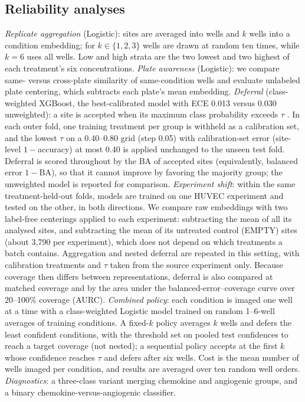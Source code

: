 \documentclass[conference]{IEEEtran}
\begin{document}
\subsection{Reliability analyses}
\emph{Replicate aggregation} (Logistic): sites are averaged into wells and $k$ wells into a condition embedding; for $k\in\{1,2,3\}$ wells are drawn at random ten times, while $k=6$ uses all wells. Low and high strata are the two lowest and two highest of each treatment's six concentrations. \emph{Plate awareness} (Logistic): we compare same- versus cross-plate similarity of same-condition wells and evaluate unlabeled plate centering, which subtracts each plate's mean embedding. \emph{Deferral} (class-weighted XGBoost, the best-calibrated model with ECE 0.013 versus 0.030 unweighted): a site is accepted when its maximum class probability exceeds $\tau$ \cite{geifman2017}. In each outer fold, one training treatment per group is withheld as a calibration set, and the lowest $\tau$ on a 0.40--0.80 grid (step 0.05) with calibration-set error (site-level $1-$accuracy) at most 0.40 is applied unchanged to the unseen test fold. Deferral is scored throughout by the BA of accepted sites (equivalently, balanced error $1-\mathrm{BA}$), so that it cannot improve by favoring the majority group; the unweighted model is reported for comparison. \emph{Experiment shift}: within the same treatment-held-out folds, models are trained on one HUVEC experiment and tested on the other, in both directions. We compare raw embeddings with two label-free centerings applied to each experiment: subtracting the mean of all its analysed sites, and subtracting the mean of its untreated control (EMPTY) sites (about 3,790 per experiment), which does not depend on which treatments a batch contains. Aggregation and nested deferral are repeated in this setting, with calibration treatments and $\tau$ taken from the source experiment only. Because coverage then differs between representations, deferral is also compared at matched coverage and by the area under the balanced-error--coverage curve over 20--100\% coverage (AURC). \emph{Combined policy}: each condition is imaged one well at a time with a class-weighted Logistic model trained on random 1--6-well averages of training conditions. A fixed-$k$ policy averages $k$ wells and defers the least confident conditions, with the threshold set on pooled test confidences to reach a target coverage (not nested); a sequential policy accepts at the first $k$ whose confidence reaches $\tau$ and defers after six wells. Cost is the mean number of wells imaged per condition, and results are averaged over ten random well orders. \emph{Diagnostics}: a three-class variant merging chemokine and angiogenic groups, and a binary chemokine-versus-angiogenic classifier.
\end{document}

